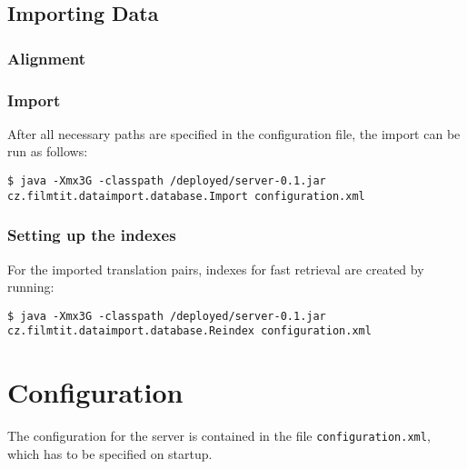 \subsection{Importing Data}

\label{sec:import}

\subsubsection{Alignment}

\todo{!}


\subsubsection{Import}

After all necessary paths are specified in the configuration file, the import can be run as follows:

\vspace*{0.5em}
\begin{lstlisting}
$ java -Xmx3G -classpath /deployed/server-0.1.jar cz.filmtit.dataimport.database.Import configuration.xml
\end{lstlisting}
\vspace*{0.5em}


\subsubsection{Setting up the indexes}

For the imported translation pairs, indexes for fast retrieval are created by running:

\vspace*{0.5em}
\begin{lstlisting}
$ java -Xmx3G -classpath /deployed/server-0.1.jar cz.filmtit.dataimport.database.Reindex configuration.xml
\end{lstlisting}
\vspace*{0.5em}




\section{Configuration}
\label{sec:config}

The configuration for the server is contained in the file \verb#configuration.xml#, which has to be specified on startup.

